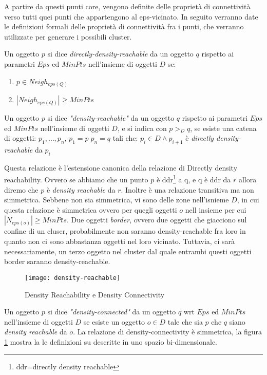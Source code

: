  
A partire da questi punti core, vengono definite delle proprietà di connettività verso  tutti quei punti che appartengono al eps-vicinato.
In seguito verranno date le definizioni formali delle proprietà di connettività fra i punti, che verranno utilizzate per generare i possibili cluster.
\begin{definizione}
\label{def:ddr}
Un oggetto $p$ si dice 	\emph{directly-density-reachable} da un oggetto $q$ rispetto ai parametri $Eps$ ed $MinPts$ nell'insieme di oggetti $D$ se:
\begin{enumerate}
\item $p \in Neigh_{eps(Q)}$
\item $|Neigh_{eps(Q)}| \ge MinPts$
\end{enumerate}
\end{definizione}
\begin{definizione}
\label{def:dr} 
Un oggetto   $p$ si dice 	\emph{"density-reachable"} da un oggetto $q$ rispetto ai parametri $Eps$ ed $MinPts$ nell'insieme di oggetti $D$, e si  indica con \emph{$p>_{D}q$}, se esiste una catena di oggetti: $p_1,\dots,p_n$, $p_1=p\; p_n=q$ tali che:  $p_{i} \in D  \land p_{i+1}$ è \emph{directly density-reachable} da $p_{i}$
\end{definizione}
Questa relazione è l'estensione canonica della relazione di  Directly density reachability. Ovvero se abbiamo che un punto $p$ è ddr\footnote{ddr=directly density reachable} a q, e q è ddr da $r$ allora diremo che $p$ è \emph{density reachable} da $r$.
Inoltre è una relazione transitiva ma non simmetrica. Sebbene non sia simmetrica, vi sono delle zone nell'isnieme $D$, in cui questa relazione è simmetrica ovvero  per quegli oggetti $o$ nell insieme per cui $|N_{eps(o)}| \ge MinPts$. Due oggetti \emph{border}, ovvero due oggetti che giacciono sul confine di un cluser, probabilmente non saranno density-reachable fra loro in quanto non ci sono abbastanza oggetti nel loro vicinato. Tuttavia, ci sarà necessariamente, un terzo oggetto nel cluster dal quale entrambi questi  oggetti border saranno density-reachable.
\begin{figure}
\centering
\texttt{[image: density-reachable]}
\caption{Density Reachability e Density Connectivity}
\label{fig:dens-reach}
\end{figure}
\begin{definizione}
\label{def:dc}
Un oggetto $p$ si dice 	\emph{"density-connected"} da un oggetto $q$ wrt $Eps$ ed $MinPts$ nell'insieme di oggetti $D$ se esiste un oggetto $o \in D$  tale che sia $p$ che $q$ siano \emph{ density reachable} da $o$. La relazione di density-connectivity è simmetrica, la figura \ref{fig:dens-reach} mostra la le definizioni su descritte in uno spazio bi-dimensionale. 
\end{definizione} 
